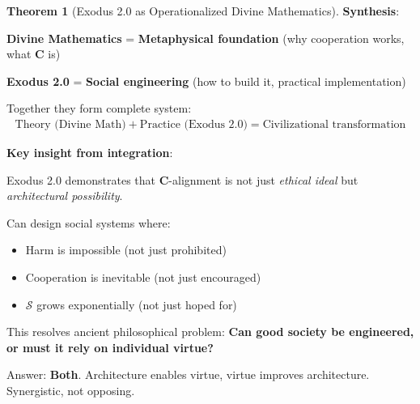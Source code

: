 \documentclass[11pt,a4paper]{article}
\theoremstyle{definition}
\newtheorem{theorem}{Theorem}[section]
\theoremstyle{remark}
\begin{document}
\begin{small}
\begin{enumerate}
\begin{theorem}[Exodus 2.0 as Operationalized Divine Mathematics]
\vspace{1em}

\textbf{Synthesis}:

\textbf{Divine Mathematics} = \textbf{Metaphysical foundation} (why cooperation works, what \(\mathbf{C}\) is)

\textbf{Exodus 2.0} = \textbf{Social engineering} (how to build it, practical implementation)

Together they form complete system:
\begin{align}
\text{Theory (Divine Math)} + \text{Practice (Exodus 2.0)} = \text{Civilizational transformation}
\end{align}

\textbf{Key insight from integration}:

Exodus 2.0 demonstrates that \(\mathbf{C}\)-alignment is not just \textit{ethical ideal} but \textit{architectural possibility}.

Can design social systems where:
\begin{itemize}
    \item Harm is impossible (not just prohibited)
    \item Cooperation is inevitable (not just encouraged)
    \item \(\mathcal{S}\) grows exponentially (not just hoped for)
\end{itemize}

This resolves ancient philosophical problem: \textbf{Can good society be engineered, or must it rely on individual virtue?}

Answer: \textbf{Both}. Architecture enables virtue, virtue improves architecture. Synergistic, not opposing.
\end{theorem}

\begin{figure}[H]
\centering
{}
\end{figure}
\end{enumerate}
\end{small}
\end{document}
